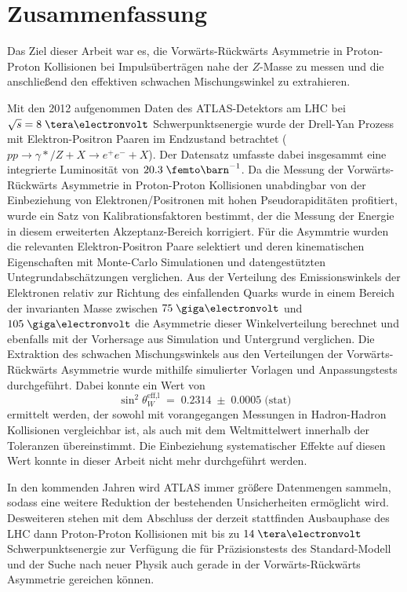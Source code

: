 

\chapter{Zusammenfassung}

Das Ziel dieser Arbeit war es, die Vorwärts-Rückwärts Asymmetrie in
Proton-Proton Kollisionen bei Impulsüberträgen nahe der $Z$-Masse zu messen und
die anschließend den effektiven schwachen Mischungswinkel zu extrahieren.

Mit den 2012 aufgenommen Daten des ATLAS-Detektors am LHC bei $\sqrt{s}=8\TeV$
Schwerpunktsenergie wurde der Drell-Yan Prozess mit Elektron-Positron Paaren im
Endzustand betrachtet ($pp\rightarrow \gamma*/Z +X \rightarrow e^+e^-+X$). Der
Datensatz umfasste dabei insgesammt eine integrierte Luminosität von
$20.3\fb^{-1}$. Da die Messung der Vorwärts-Rückwärts Asymmetrie in
Proton-Proton Kollisionen unabdingbar von der Einbeziehung von
Elektronen/Positronen mit hohen Pseudorapiditäten profitiert, wurde ein Satz
von Kalibrationsfaktoren bestimmt, der die Messung der Energie in diesem
erweiterten Akzeptanz-Bereich korrigiert. Für die Asymmtrie wurden die
relevanten Elektron-Positron Paare selektiert und deren kinematischen
Eigenschaften mit Monte-Carlo Simulationen und datengestützten
Untegrundabschätzungen verglichen. Aus der Verteilung des Emissionswinkels der
Elektronen relativ zur Richtung des einfallenden Quarks wurde in einem Bereich
der invarianten Masse zwischen $75\GeV$ und $105\GeV$ die Asymmetrie dieser
Winkelverteilung berechnet und ebenfalls mit der Vorhersage aus Simulation und
Untergrund verglichen. Die Extraktion des schwachen Mischungswinkels aus den
Verteilungen der Vorwärts-Rückwärts Asymmetrie wurde mithilfe simulierter
Vorlagen  und Anpassungstests durchgeführt. Dabei konnte ein Wert von 
\begin{equation*}
    \sin^2\theta_W^\text{eff,l} \;=\; 0.2314
        \;\pm\; 0.0005 \;\text{(stat)}
\end{equation*}
ermittelt werden, der sowohl mit vorangegangen Messungen in Hadron-Hadron
Kollisionen vergleichbar ist, als auch mit dem Weltmittelwert innerhalb der
Toleranzen übereinstimmt. Die Einbeziehung systematischer Effekte auf diesen
Wert konnte in dieser Arbeit nicht mehr durchgeführt werden.

In den kommenden Jahren wird ATLAS immer größere Datenmengen sammeln, sodass
eine weitere Reduktion der bestehenden Unsicherheiten ermöglicht wird.
Desweiteren stehen mit dem Abschluss der derzeit stattfinden Ausbauphase des
\ac{LHC} dann Proton-Proton Kollisionen mit bis zu $14\TeV$ Schwerpunktsenergie
zur Verfügung die für Präzisionstests des Standard-Modell und der Suche nach
neuer Physik auch gerade in der Vorwärts-Rückwärts Asymmetrie gereichen können. 

